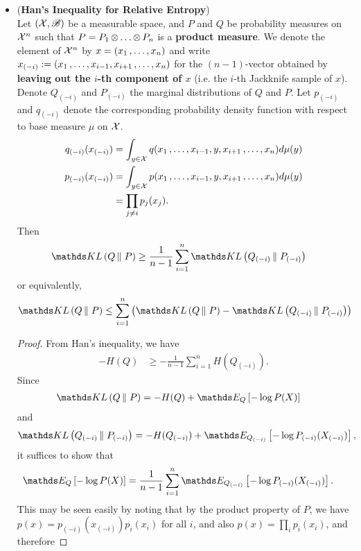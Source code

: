 \documentclass[11pt]{article}
\begin{document}
\begin{itemize}
\item \begin{proposition} (\textbf{Han's Inequality for Relative Entropy}) \citep{boucheron2013concentration}\\
Let $({\mathcal X}, {\mathscr B})$ be a measurable space, and $P$ and $Q$ be probability measures on ${\mathcal X}^{n}$ such that $P = P_1 \,{\otimes}\ldots{\otimes}\, P_n$ is a \textbf{product measure}. We denote the element of ${\mathcal X}^{n}$ by $x = (x_1 \,{,}\ldots{,}\, x_n)$ and write $x_{(-i)} := (x_1 \,{,}\ldots{,}\, x_{i-1}, x_{i+1} \,{,}\ldots{,}\, x_n)$ for the $(n-1)$-vector obtained by \textbf{leaving out the $i$-th component of $x$} (i.e. the $i$-th Jackknife sample of $x$). Denote $Q_{(-i)}$ and $P_{(-i)}$ the marginal distributions of $Q$ and $P$. Let $p_{(-i)}$ and $q_{(-i)}$ denote the corresponding probability density function with respect to base measure $\mu$ on ${\mathcal X}$.
\begin{align*}
q_{(-i)}(x_{(-i)}) &= \int_{y \in {\mathcal X}}q(x_1 \,{,}\ldots{,}\, x_{i-1}, y, x_{i+1} \,{,}\ldots{,}\, x_n) d\mu(y)\\
p_{(-i)}(x_{(-i)}) &= \int_{y \in {\mathcal X}}p(x_1 \,{,}\ldots{,}\, x_{i-1}, y, x_{i+1} \,{,}\ldots{,}\, x_n) d\mu(y)\\
&= \prod_{j \neq i}p_{j}(x_j).
\end{align*} Then 
\begin{align}
\kl{Q}{P} &\ge \frac{1}{n-1}\sum_{i=1}^{n}\kl{Q_{(-i)}}{P_{(-i)}}  \label{ineqn: han_inequality_relative_entropy}
\end{align} or equivalently, 
\begin{align}
\kl{Q}{P} &\le \sum_{i=1}^{n}\paren{\kl{Q}{P} - \kl{Q_{(-i)}}{P_{(-i)}}}  \label{ineqn: han_inequality_relative_entropy_2}
\end{align}
\end{proposition}
\begin{proof}
From Han's inequality, we have
\begin{align*}
-H(Q) &\ge -\frac{1}{n-1}\sum_{i=1}^{n}H(Q_{(-i)}).
\end{align*} Since
\begin{align*}
\kl{Q}{P} &= -H(Q) + \E{Q}{-\log P(X)}
\end{align*} and
\begin{align*}
\kl{Q_{(-i)}}{P_{(-i)}} &= -H(Q_{(-i)}) + \E{Q_{(-i)}}{-\log P_{(-i)}(X_{(-i)})}, 
\end{align*} it suffices to show that 
\begin{align*}
\E{Q}{-\log P(X)} &= \frac{1}{n-1}\sum_{i=1}^{n}\E{Q_{(-i)}}{-\log P_{(-i)}(X_{(-i)})}.
\end{align*} This may be seen easily by noting that by the product property of $P$, we have $p(x) = p_{(-i)}(x_{(-i)})p_i(x_i)$ for all $i$, and also $p(x) = \prod_i p_i(x_i)$, and therefore

\end{proof}
\end{itemize}
\end{document}
